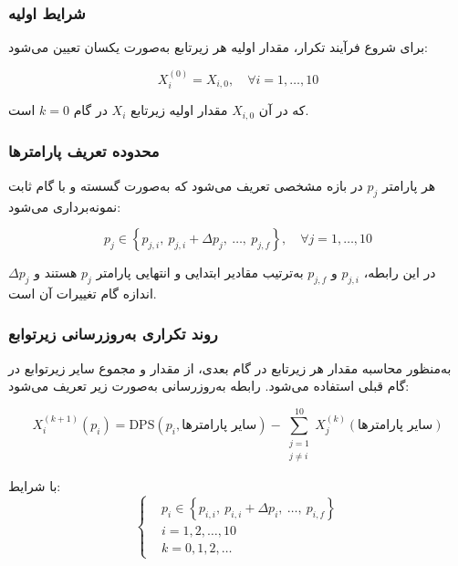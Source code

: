 \subsubsection{شرایط اولیه}

برای شروع فرآیند تکرار، مقدار اولیه هر زیرتابع به‌صورت یکسان تعیین می‌شود:

\begin{equation}
X_i^{(0)} = X_{i,0},\quad \forall i = 1,\ldots,10
\end{equation}

که در آن $X_{i,0}$ مقدار اولیه زیرتابع $X_i$ در گام $k=0$ است.

\subsubsection{محدوده تعریف پارامترها}

هر پارامتر $p_j$ در بازه مشخصی تعریف می‌شود که به‌صورت گسسته و با گام ثابت نمونه‌برداری می‌شود:

\begin{equation}
p_j \in \left\{p_{j,i},\ p_{j,i}+\Delta p_j,\ \ldots,\ p_{j,f}\right\},\quad \forall j = 1,\ldots,10
\end{equation}

در این رابطه، $p_{j,i}$ و $p_{j,f}$ به‌ترتیب مقادیر ابتدایی و انتهایی پارامتر $p_j$ هستند و $\Delta p_j$ اندازه گام تغییرات آن است.

\subsubsection{روند تکراری به‌روزرسانی زیرتوابع}

به‌منظور محاسبه مقدار هر زیرتابع در گام بعدی، از مقدار  و مجموع سایر زیرتوابع در گام قبلی استفاده می‌شود. رابطه به‌روزرسانی به‌صورت زیر تعریف می‌شود:

\begin{equation}
X_i^{(k+1)}(p_i) = \mathrm{DPS}(p_i,\text{سایر پارامترها}) - \sum_{\substack{j=1 \\ j \ne i}}^{10} X_j^{(k)}(\text{سایر پارامترها})
\end{equation}

با شرایط:
\[
\left\{
\begin{aligned}
& p_i \in \left\{p_{i,i},\ p_{i,i}+\Delta p_i,\ \ldots,\ p_{i,f} \right\} \\
& i = 1,2,\ldots,10 \\
& k = 0,1,2,\ldots
\end{aligned}
\right.
\]

